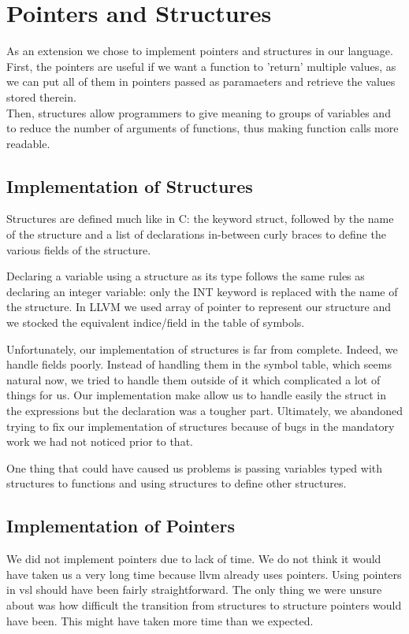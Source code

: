 \documentclass{article}
\begin{document}
\section{Pointers and Structures}
As an extension we chose to implement pointers and structures in our language. First, the pointers are useful
if we want a function to 'return' multiple values, as we can put all of them in pointers passed as paramaeters and retrieve the values stored therein.\\
Then, structures allow programmers to give meaning to groups of variables and to reduce the number of arguments of functions, thus making function calls more readable. 

\subsection{Implementation of Structures}

Structures are defined much like in C: the keyword struct, followed by the name of the structure and a list of declarations in-between curly braces to define the various fields of the structure.

Declaring a variable using a structure as its type follows the same rules as declaring an integer variable: only the INT keyword is replaced with the name of the structure.
In LLVM we used array of pointer to represent our structure and we stocked the equivalent indice/field in the table of symbols. 

Unfortunately, our implementation of structures is far from complete. Indeed, we handle fields poorly. Instead of handling them in the symbol table, which seems natural now, we tried to handle them outside of it which complicated a lot of things for us. Our implementation make allow us to handle easily the struct in the expressions but the declaration was a tougher part. Ultimately, we abandoned trying to fix our implementation of structures because of bugs in the mandatory work we had not noticed prior to that.

One thing that could have caused us problems is passing variables typed with structures to functions and using structures to define other structures.

\subsection{Implementation of Pointers}

We did not implement pointers due to lack of time. We do not think it would have taken us a very long time because llvm already uses pointers. Using pointers in vsl should have been fairly straightforward. The only thing we were unsure about was how difficult the transition from structures to structure pointers would have been. This might have taken more time than we expected.
\end{document}
